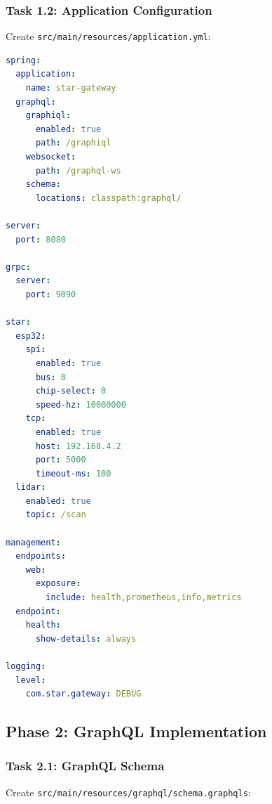 \subsubsection{Task 1.2: Application Configuration}

Create \texttt{src/main/resources/application.yml}:

\begin{lstlisting}[language=yaml, caption=application.yml]
spring:
  application:
    name: star-gateway
  graphql:
    graphiql:
      enabled: true
      path: /graphiql
    websocket:
      path: /graphql-ws
    schema:
      locations: classpath:graphql/

server:
  port: 8080

grpc:
  server:
    port: 9090

star:
  esp32:
    spi:
      enabled: true
      bus: 0
      chip-select: 0
      speed-hz: 10000000
    tcp:
      enabled: true
      host: 192.168.4.2
      port: 5000
      timeout-ms: 100
  lidar:
    enabled: true
    topic: /scan

management:
  endpoints:
    web:
      exposure:
        include: health,prometheus,info,metrics
  endpoint:
    health:
      show-details: always

logging:
  level:
    com.star.gateway: DEBUG
\end{lstlisting}

\subsection{Phase 2: GraphQL Implementation}

\subsubsection{Task 2.1: GraphQL Schema}

Create \texttt{src/main/resources/graphql/schema.graphqls}:

